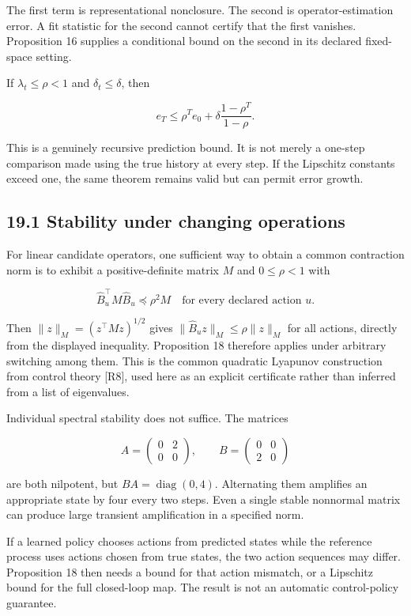 \documentclass[11pt,letterpaper]{article}
\begin{document}
The first term is representational nonclosure. The second is
operator-estimation error. A fit statistic for the second cannot certify
that the first vanishes. Proposition 16 supplies a conditional bound on
the second in its declared fixed-space setting.

If \(\lambda_t\leq\rho<1\) and \(\delta_t\leq\delta\), then

\[
e_T\leq\rho^Te_0+\delta\frac{1-\rho^T}{1-\rho}.
\]

This is a genuinely recursive prediction bound. It is not merely a
one-step comparison made using the true history at every step. If the
Lipschitz constants exceed one, the same theorem remains valid but can
permit error growth.

\subsection{19.1 Stability under changing
operations}\label{stability-under-changing-operations}

For linear candidate operators, one sufficient way to obtain a common
contraction norm is to exhibit a positive-definite matrix \(M\) and
\(0\leq\rho<1\) with

\[
\widehat B_u^\top M\widehat B_u\preceq\rho^2M
\quad\text{for every declared action }u.
\]

Then \(\|z\|_M=(z^\top Mz)^{1/2}\) gives
\(\|\widehat B_uz\|_M\leq\rho\|z\|_M\) for all actions, directly from
the displayed inequality. Proposition 18 therefore applies under
arbitrary switching among them. This is the common quadratic Lyapunov
construction from control theory {[}R8{]}, used here as an explicit
certificate rather than inferred from a list of eigenvalues.

Individual spectral stability does not suffice. The matrices

\[
A=\begin{pmatrix}0&2\\0&0\end{pmatrix},\qquad
B=\begin{pmatrix}0&0\\2&0\end{pmatrix}
\]

are both nilpotent, but \(BA=\operatorname{diag}(0,4)\). Alternating
them amplifies an appropriate state by four every two steps. Even a
single stable nonnormal matrix can produce large transient amplification
in a specified norm.

If a learned policy chooses actions from predicted states while the
reference process uses actions chosen from true states, the two action
sequences may differ. Proposition 18 then needs a bound for that action
mismatch, or a Lipschitz bound for the full closed-loop map. The result
is not an automatic control-policy guarantee.
\end{document}

